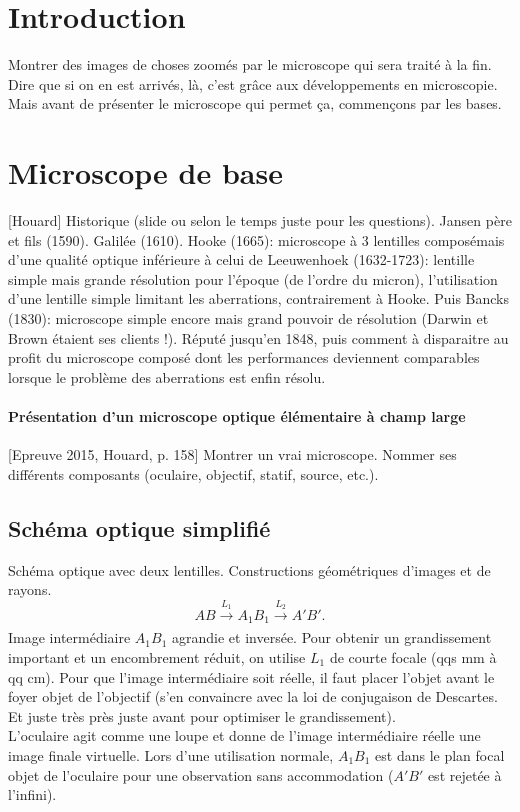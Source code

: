 \documentclass[11pt]{report}
\numberwithin{figure}{section}
\numberwithin{equation}{section}
\numberwithin{table}{section}
\newcommand{\1}{\boldsymbol{1}}
\begin{document}
\section*{Introduction}
  
Montrer des images de choses zoomés par le microscope qui sera traité à la fin. Dire que si on en est arrivés, là, c'est grâce aux développements en microscopie. Mais avant de présenter le microscope qui permet ça, commençons par les bases.
  
\section{Microscope de base}

[Houard] Historique (slide ou selon le temps juste pour les questions). Jansen père et fils (1590). Galilée (1610). Hooke (1665): microscope à 3 lentilles composémais d’une qualité optique inférieure à celui de Leeuwenhoek  (1632-1723): lentille simple mais grande résolution pour l'époque (de l'ordre du micron), l'utilisation d'une lentille simple limitant les aberrations, contrairement à Hooke. Puis Bancks (1830): microscope simple encore mais grand pouvoir de résolution (Darwin et Brown étaient ses clients !). Réputé jusqu'en 1848, puis comment à disparaitre au profit du microscope composé dont les performances deviennent comparables lorsque le problème des aberrations est enfin résolu.

\paragraph{Présentation d'un microscope optique élémentaire à champ large} [Epreuve 2015, Houard, p. 158] Montrer un vrai microscope. Nommer ses différents composants (oculaire, objectif, statif, source, etc.).


\subsection{Schéma optique simplifié}

Schéma optique avec deux lentilles. Constructions géométriques d'images et de rayons.
\begin{equation}
AB \xrightarrow[]{L_1} A_1 B_1 \xrightarrow[]{L_2} A'B'.
\end{equation}
Image intermédiaire $A_1 B_1$ agrandie et inversée. Pour obtenir un grandissement important et un encombrement réduit, on utilise $L_1$ de courte focale (qqs mm à qq cm). Pour que l'image intermédiaire soit réelle, il faut placer l'objet avant le foyer objet de l'objectif (s'en convaincre avec la loi de conjugaison de Descartes. Et juste très près juste avant pour optimiser le grandissement).\\
L'oculaire agit comme une loupe et donne de l'image intermédiaire réelle une image finale virtuelle. Lors d'une utilisation normale, $A_1B_1$ est dans le plan focal objet de l'oculaire pour une observation sans accommodation ($A'B'$ est rejetée à l'infini).
\end{document}
